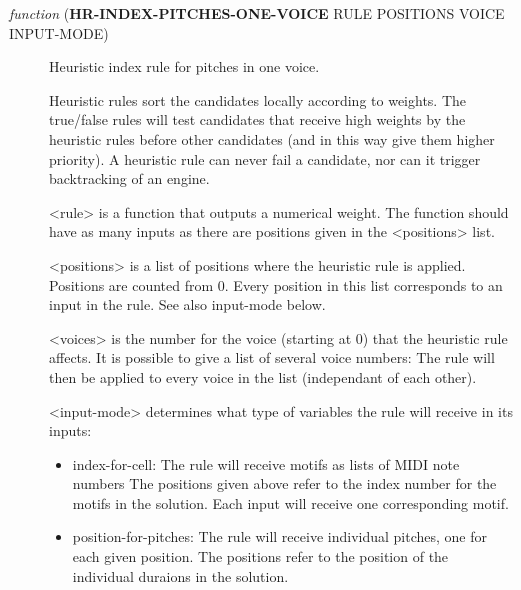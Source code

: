 \begin{description}
\item[{ \emph{function} (\textbf{HR-INDEX-PITCHES-ONE-VOICE} RULE POSITIONS VOICE INPUT-MODE)}] Heuristic index rule for pitches in one voice.

Heuristic rules sort the candidates locally according to weights. 
The true/false rules will test candidates that receive high weights by
the heuristic rules before other candidates (and in this way give them
higher priority). A heuristic rule can never fail a candidate, nor 
can it trigger backtracking of an engine. 

<rule> is a function that outputs a numerical weight. The function 
should have as many inputs as there are positions given in the 
<positions> list. 

<positions> is a list of positions where the heuristic rule is applied.
Positions are counted from 0. Every position in this list corresponds to
an input in the rule. See also input-mode below.

<voices> is the number for the voice (starting at 0) that the heuristic 
rule affects. It is possible to give a list of several voice numbers: 
The rule will then be applied to every voice in the list (independant 
of each other).

<input-mode> determines what type of variables the rule will receive in 
its inputs:
\begin{itemize}
\item index-for-cell: The rule will receive motifs as lists of MIDI note 
numbers The positions given above refer to the index
number for the motifs in the solution. Each input 
will receive one corresponding motif.
\item position-for-pitches: The rule will receive individual
pitches, one for each given position.
The positions refer to the position
of the individual duraions in the solution.
\end{itemize}
\end{description}



